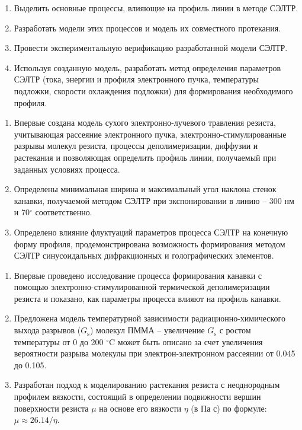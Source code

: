 \begin{enumerate}
	\item Выделить основные процессы, влияющие на профиль линии в методе СЭЛТР.
	\item Разработать модели этих процессов и модель их совместного протекания.
	\item Провести экспериментальную верификацию разработанной модели СЭЛТР.
	\item Используя созданную модель, разработать метод определения параметров СЭЛТР (тока, энергии и профиля электронного пучка, температуры подложки, скорости охлаждения подложки) для формирования необходимого профиля.	
\end{enumerate}


\begin{enumerate}
	\item Впервые создана модель сухого электронно-лучевого травления резиста, учитывающая рассеяние электронного пучка, электронно-стимулированные разрывы молекул резиста, процессы деполимеризации, диффузии и растекания и позволяющая определить профиль линии, получаемый при заданных условиях процесса.
	\item Определены минимальная ширина и максимальный угол наклона стенок канавки, получаемой методом СЭЛТР при экспонировании в линию -- 300 нм и 70$^\circ$ соответственно.
	\item Определено влияние флуктуаций параметров процесса СЭЛТР на конечную форму профиля, продемонстрирована возможность формирования методом СЭЛТР синусоидальных дифракционных и голографических элементов.
\end{enumerate}


\novelty
\begin{enumerate}
	\item Впервые проведено исследование процесса формирования канавки с помощью электронно-стимулированной термической деполимеризации резиста и показано, как параметры процесса влияют на профиль канавки.
	\item Предложена модель температурной зависимости радиационно-химического выхода разрывов ($G_\mathrm{s}$) молекул ПММА -- увеличение $G_\mathrm{s}$ с ростом температуры от 0 до 200 $^\circ$C может быть описано за счет увеличения вероятности разрыва молекулы при электрон-электронном рассеянии от 0.045 до 0.105.
	\item Разработан подход к моделированию растекания резиста с неоднородным профилем вязкости, состоящий в определении подвижности вершин поверхности резиста $\mu$ на основе его вязкости $\eta$ (в Па с) по формуле: $\mu \approx 26.14 / \eta$.
\end{enumerate}


